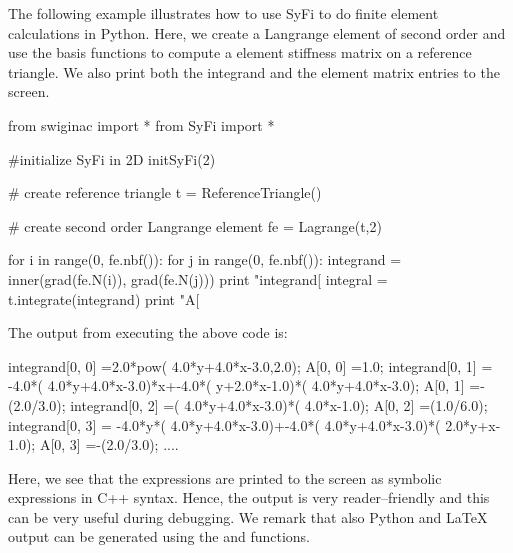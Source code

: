 The following example illustrates how to use SyFi to do finite element
calculations in Python.  Here, we create a Langrange element of second
order and use the basis functions to compute a element stiffness matrix
on a reference triangle. We also print both the integrand and the element
matrix entries to the screen.
\begin{python}
from swiginac import *
from SyFi import *

#initialize SyFi in 2D
initSyFi(2)

# create reference triangle
t = ReferenceTriangle()

# create second order Langrange element
fe = Lagrange(t,2)

for i in range(0, fe.nbf()):
    for j in range(0, fe.nbf()):
        integrand = inner(grad(fe.N(i)), grad(fe.N(j)))
        print "integrand[%
        integral = t.integrate(integrand)
        print "A[%
\end{python}
The output from executing the above code is:
\begin{c++}
integrand[0, 0]  =2.0*pow( 4.0*y+4.0*x-3.0,2.0);
A[0, 0]          =1.0;
integrand[0, 1]  = -4.0*( 4.0*y+4.0*x-3.0)*x+-4.0*( y+2.0*x-1.0)*( 4.0*y+4.0*x-3.0);
A[0, 1]          =-(2.0/3.0);
integrand[0, 2]  =( 4.0*y+4.0*x-3.0)*( 4.0*x-1.0);
A[0, 2]          =(1.0/6.0);
integrand[0, 3]  = -4.0*y*( 4.0*y+4.0*x-3.0)+-4.0*( 4.0*y+4.0*x-3.0)*( 2.0*y+x-1.0);
A[0, 3]          =-(2.0/3.0);
....
\end{c++}
Here, we see that the expressions are printed to the screen as symbolic
expressions in C++ syntax. Hence, the output is very reader--friendly
and this can be very useful during debugging.  We remark that also
Python and LaTeX output can be generated using the 
and  functions.


